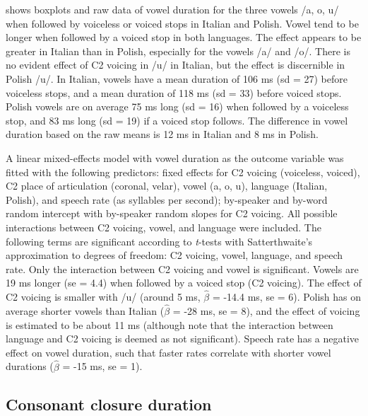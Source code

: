 \documentclass[preprint]{JASAnew}
\begin{document}
 shows boxplots and raw data of vowel duration for
the three vowels /a, o, u/ when followed by voiceless or voiced stops in
Italian and Polish. Vowel tend to be longer when followed by a voiced
stop in both languages. The effect appears to be greater in Italian than
in Polish, especially for the vowels /a/ and /o/. There is no evident
effect of C2 voicing in /u/ in Italian, but the effect is discernible in
Polish /u/. In Italian, vowels have a mean duration of 106 ms (sd = 27)
before voiceless stops, and a mean duration of 118 ms (sd = 33) before
voiced stops. Polish vowels are on average 75 ms long (sd = 16) when
followed by a voiceless stop, and 83 ms long (sd = 19) if a voiced stop
follows. The difference in vowel duration based on the raw means is 12
ms in Italian and 8 ms in Polish.

A linear mixed-effects model with vowel duration as the outcome variable
was fitted with the following predictors: fixed effects for C2 voicing
(voiceless, voiced), C2 place of articulation (coronal, velar), vowel
(a, o, u), language (Italian, Polish), and speech rate (as syllables per
second); by-speaker and by-word random intercept with by-speaker random
slopes for C2 voicing. All possible interactions between C2 voicing,
vowel, and language were included. The following terms are significant
according to \emph{t}-tests with Satterthwaite's approximation to
degrees of freedom: C2 voicing, vowel, language, and speech rate. Only
the interaction between C2 voicing and vowel is significant. Vowels are
19 ms longer (se = 4.4) when followed by a voiced stop (C2 voicing). The
effect of C2 voicing is smaller with /u/ (around 5 ms, \(\hat{\beta}\) =
-14.4 ms, se = 6). Polish has on average shorter vowels than Italian
(\(\hat{\beta}\) = -28 ms, se = 8), and the effect of voicing is
estimated to be about 11 ms (although note that the interaction between
language and C2 voicing is deemed as not significant). Speech rate has a
negative effect on vowel duration, such that faster rates correlate with
shorter vowel durations (\(\hat{\beta}\) = -15 ms, se = 1).

\hypertarget{consonant-closure-duration}{%
\subsection{Consonant closure
duration}\label{consonant-closure-duration}}
\end{document}

